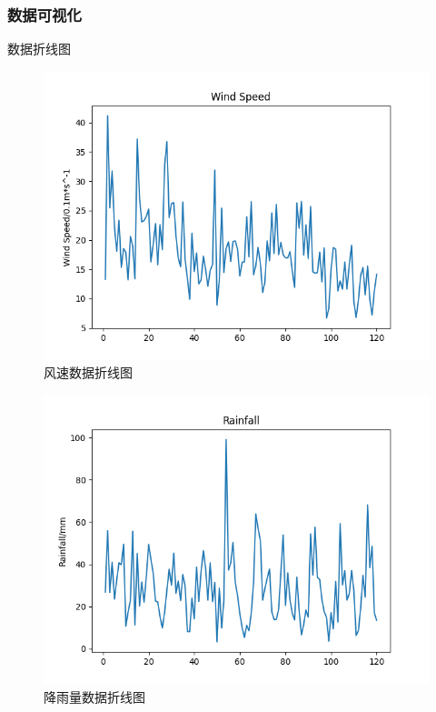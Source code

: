 \documentclass[10pt]{beamer}
\begin{document}
\begin{frame}
	\frametitle{数据可视化}
	\begin{block}{数据折线图}
		\begin{figure}[h!]
			\centering
			\includegraphics[scale=0.21]{../src/prepare_data/fg.png}
			\caption{风速数据折线图}
		\end{figure}

		\begin{figure}[h!]
			\centering
			\includegraphics[scale=0.21]{../src/prepare_data/rr.png}
			\caption{降雨量数据折线图}
		\end{figure}


\end{block}
\end{frame}
\end{document}
